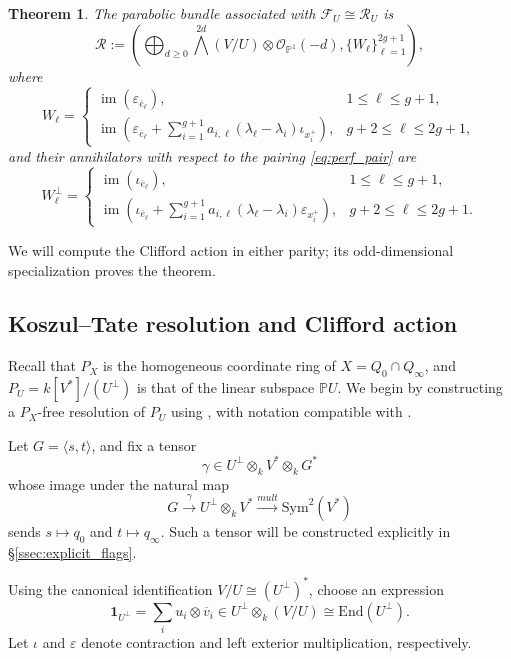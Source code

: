 \documentclass[12pt, letterpaper]{amsart}
\newtheorem{theorem}{Theorem}[section]
\theoremstyle{definition}
\newcommand{\PP}{\mathbb{P} }
\newcommand{\cF}{\mathcal{F} }
\newcommand{\cO}{\mathcal{O} }
\newcommand{\cR}{\mathcal{R} }
\newcommand{\ga}{\gamma}
\def\rEnd{\mathrm{End} }
\def\Sym{\mathrm{Sym} }
\begin{document}
\begin{theorem}\label{thm:raynaud_parabolic}
The parabolic bundle associated with \(\cF_U\cong\cR_U\) is
\[\cR:= \left( \bigoplus_{d\ge0} \bigwedge^{2d}(V/U)\otimes \cO_{\PP^1}(-d), \{W_\ell\}_{\ell=1}^{2g+1} \right),\]
where
\[
W_\ell= \begin{cases}
  \operatorname{im}(\varepsilon_{\overline e_\ell}), &1\le\ell\le g+1,\\[4pt]
  \operatorname{im}\!\left( \varepsilon_{\overline e_\ell} +\displaystyle\sum_{i=1}^{g+1} a_{i,\ell}(\lambda_\ell-\lambda_i)\iota_{x_i^+} \right), &g+2\le\ell\le2g+1,
\end{cases}
\]
and their annihilators with respect to the pairing \eqref{eq:perf_pair} are
\[
W_\ell^\perp= \begin{cases}
  \operatorname{im}(\iota_{\overline e_\ell}), &1\le\ell\le g+1,\\[4pt]
  \operatorname{im}\!\left( \iota_{\overline e_\ell} +\displaystyle\sum_{i=1}^{g+1} a_{i,\ell}(\lambda_\ell-\lambda_i)\varepsilon_{x_i^+} \right), &g+2\le\ell\le2g+1.
\end{cases}
\]
\end{theorem}

We will compute the Clifford action in either parity; its odd-dimensional specialization proves the theorem.

\subsection{Koszul--Tate resolution and Clifford action}\label{ssec:KT_res}

Recall that \(P_X\) is the homogeneous coordinate ring of \(X = Q_0 \cap Q_\infty\), and \(P_U = k[V^*]/(U^\perp)\) is that of the linear subspace \(\PP U\). We begin by constructing a \(P_X\)-free resolution of \(P_U\) using \cite[Theorem~4]{Tat57}, with notation compatible with \cite[Proposition~4.4]{ES25}.

Let \(G=\langle s, t\rangle\), and fix a tensor
\[\ga\in U^\perp\otimes_k V^*\otimes_k G^*\]
whose image under the natural map
\[G\xrightarrow{\ga}U^\perp\otimes_kV^*\xrightarrow{mult}\Sym^2(V^*)\]
sends \(s\mapsto q_0\) and \(t\mapsto q_\infty\). Such a tensor will be constructed explicitly in \S\ref{ssec:explicit_flags}.

Using the canonical identification \(V/U\cong (U^\perp)^*\), choose an expression
\[\mathbf 1_{U^\perp}=\sum_i u_i\otimes \overline v_i\in U^\perp\otimes_k (V/U)\cong \rEnd(U^\perp).\]
Let \(\iota\) and \(\varepsilon\) denote contraction and left exterior multiplication, respectively.
\end{document}
